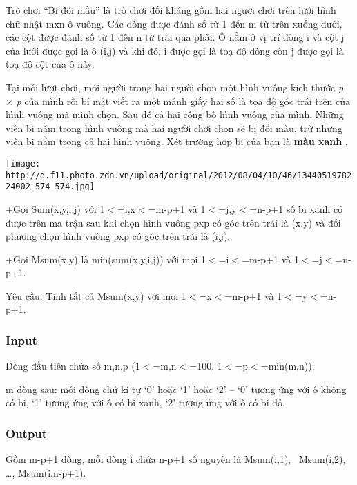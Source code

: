 



   Trò chơi “Bi đổi mầu” là trò chơi đối kháng gồm hai người chơi trên lưới hình chữ nhật                                                   mxn ô vuông. Các dòng được đánh số từ 1 đến    m từ trên xuống dưới, các cột được đánh số từ 1 đến    n từ trái qua phải. Ô nằm ở vị trí dòng    i và cột j    của lưới được gọi là ô (i,j) và khi đó, i được gọi là toạ độ dòng còn j được gọi là toạ độ cột của ô này.  

   Tại mỗi lượt chơi, mỗi người trong hai người chọn một hình vuông kích thước   \emph{    p   }   ×   \emph{    p   }   của mình rồi bí mật viết ra một mảnh giấy hai số là tọa độ góc trái trên của hình vuông mà mình chọn. Sau đó cả hai công bố hình vuông của mình. Những viên bi nằm trong hình vuông mà hai người chơi chọn sẽ bị đổi màu, trừ những viên bi nằm trong cả hai hình vuông. Xét trường hợp bi của bạn là   \textbf{    màu xanh   }   .  




\texttt{[image: http://d.f11.photo.zdn.vn/upload/original/2012/08/04/10/46/1344051978224002\_574\_574.jpg]}

   +Gọi Sum(x,y,i,j) với 1$<$=i,x$<$=m-p+1 và 1$<$=j,y$<$=n-p+1 số bi xanh có được trên ma trận sau khi chọn hình vuông pxp có góc trên trái là (x,y) và đối phương chọn hình vuông pxp có góc trên trái là (i,j).  

   +Gọi Msum(x,y) là min(sum(x,y,i,j)) với mọi 1$<$=i$<$=m-p+1 và 1$<$=j$<$=n-p+1.  

   Yêu cầu: Tính tất cả Msum(x,y) với mọi 1$<$=x$<$=m-p+1 và 1$<$=y$<$=n-p+1.  

\subsubsection{   Input  }

   Dòng đầu tiên chứa số m,n,p (1$<$=m,n$<$=100, 1$<$=p$<$=min(m,n)).  

   m dòng sau: mỗi dòng chứ kí tự ‘0’ hoặc ‘1’ hoặc ‘2’ – ‘0’ tương ứng với ô không có bi, ‘1’ tương ứng với ô có bi xanh, ‘2’ tương ứng với ô có bi đỏ.  

\subsubsection{   Output  }

   Gồm m-p+1 dòng, mỗi dòng i chứa n-p+1 số nguyên là Msum(i,1),  Msum(i,2), …, Msum(i,n-p+1).  

